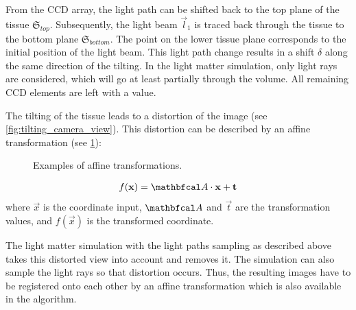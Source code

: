 From the \ac{CCD} array, the light path can be shifted back to the top plane of the tissue $\mathfrak{S}_{top}$.
Subsequently, the light beam $\vec{l}_1$ is traced back through the tissue to the bottom plane $\mathfrak{S}_{bottom}$.
The point on the lower tissue plane corresponds to the initial position of the light beam.
This light path change results in a shift $\delta$ along the same direction of the tilting.
In the light matter simulation, only light rays are considered, which will go at least partially through the volume.
All remaining \ac{CCD} elements are left with a  value.
\par
%
The tilting of the tissue leads to a distortion of the image (see \cref{fig:tilting_camera_view}).
This distortion can be described by an affine transformation (see \cref{fig::affine_transformation}):
%
\begin{figure}[!t]
\centering

\caption[]{Examples of affine transformations.}
\label{fig::affine_transformation}
\end{figure}
%
\begin{align}
f(\vec{x}) = \mat{A} \cdot \vec{x} + \vec{t}
\end{align}
where $\vec{x}$ is the coordinate input, $\mat{A}$ and $\vec{t}$ are the transformation values, and $f(\vec{x})$ is the transformed coordinate.
\par
%
The light matter simulation with the light paths sampling as described above takes this distorted view into account and removes it.
The simulation can also sample the light rays so that distortion occurs.
Thus, the resulting images have to be registered onto each other by an affine transformation which is also available in the algorithm.
%
%
%
